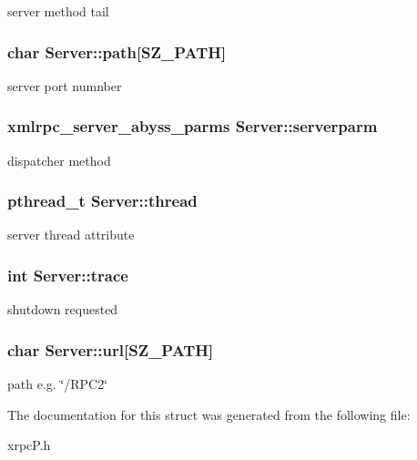 server method tail \hypertarget{structServer_3e5bdf6e881fe987617dbbe420ed39a7}{
\subsubsection[{path}]{\setlength{\rightskip}{0pt plus 5cm}char {\bf Server::path}\mbox{[}SZ\_\-PATH\mbox{]}}}
\label{structServer_3e5bdf6e881fe987617dbbe420ed39a7}


server port numnber \hypertarget{structServer_62bc9dc3ae8328ac0781cc3c7cbe148c}{
\subsubsection[{serverparm}]{\setlength{\rightskip}{0pt plus 5cm}xmlrpc\_\-server\_\-abyss\_\-parms {\bf Server::serverparm}}}
\label{structServer_62bc9dc3ae8328ac0781cc3c7cbe148c}


dispatcher method \hypertarget{structServer_b30292985309c492e4ba0ebbf2a6934a}{
\subsubsection[{thread}]{\setlength{\rightskip}{0pt plus 5cm}pthread\_\-t {\bf Server::thread}}}
\label{structServer_b30292985309c492e4ba0ebbf2a6934a}


server thread attribute \hypertarget{structServer_16b8af9cb469718b3fdfd50fbe9fbc3a}{
\subsubsection[{trace}]{\setlength{\rightskip}{0pt plus 5cm}int {\bf Server::trace}}}
\label{structServer_16b8af9cb469718b3fdfd50fbe9fbc3a}


shutdown requested \hypertarget{structServer_732b4b0eb4208cc8618eeda41d35effa}{
\subsubsection[{url}]{\setlength{\rightskip}{0pt plus 5cm}char {\bf Server::url}\mbox{[}SZ\_\-PATH\mbox{]}}}
\label{structServer_732b4b0eb4208cc8618eeda41d35effa}


path e.g. \char`\"{}/RPC2\char`\"{} 

The documentation for this struct was generated from the following file:\begin{CompactItemize}
\item 
xrpcP.h\end{CompactItemize}
